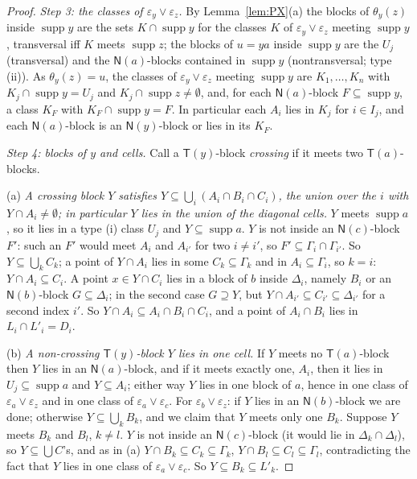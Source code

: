 \documentclass[11pt]{amsart}
\theoremstyle{definition}
\newcommand{\supp}{\operatorname{supp}}
\newcommand{\T}{\mathsf{T}}
\newcommand{\N}{\mathsf{N}}
\begin{document}
\begin{proof}
\smallskip\emph{Step 3: the classes of $\varepsilon_y\vee\varepsilon_z$.} By Lemma~\ref{lem:PX}(a) the blocks of $\theta_y(z)$ inside $\supp y$ are the sets $K\cap\supp y$ for the classes $K$ of $\varepsilon_y\vee\varepsilon_z$ meeting $\supp y$, transversal iff $K$ meets $\supp z$; the blocks of $u=ya$ inside $\supp y$ are the $U_j$ (transversal) and the $\N(a)$-blocks contained in $\supp y$ (nontransversal; type (ii)). As $\theta_y(z)=u$, the classes of $\varepsilon_y\vee\varepsilon_z$ meeting $\supp y$ are $K_1,\dots,K_n$ with $K_j\cap\supp y=U_j$ and $K_j\cap\supp z\ne\emptyset$, and, for each $\N(a)$-block $F\subseteq\supp y$, a class $K_F$ with $K_F\cap\supp y=F$. In particular each $A_i$ lies in $K_j$ for $i\in I_j$, and each $\N(a)$-block is an $\N(y)$-block or lies in its $K_F$.

\smallskip\emph{Step 4: blocks of $y$ and cells.} Call a $\T(y)$-block \emph{crossing} if it meets two $\T(a)$-blocks.

(a) \emph{A crossing block $Y$ satisfies $Y\subseteq\bigcup_i(A_i\cap B_i\cap C_i)$, the union over the $i$ with $Y\cap A_i\ne\emptyset$; in particular $Y$ lies in the union of the diagonal cells.} $Y$ meets $\supp a$, so it lies in a type (i) class $U_j$ and $Y\subseteq\supp a$. $Y$ is not inside an $\N(c)$-block $F'$: such an $F'$ would meet $A_i$ and $A_{i'}$ for two $i\ne i'$, so $F'\subseteq\Gamma_i\cap\Gamma_{i'}$. So $Y\subseteq\bigcup_kC_k$; a point of $Y\cap A_i$ lies in some $C_k\subseteq\Gamma_k$ and in $A_i\subseteq\Gamma_i$, so $k=i$: $Y\cap A_i\subseteq C_i$. A point $x\in Y\cap C_i$ lies in a block of $b$ inside $\Delta_i$, namely $B_i$ or an $\N(b)$-block $G\subseteq\Delta_i$; in the second case $G\supseteq Y$, but $Y\cap A_{i'}\subseteq C_{i'}\subseteq\Delta_{i'}$ for a second index $i'$. So $Y\cap A_i\subseteq A_i\cap B_i\cap C_i$, and a point of $A_i\cap B_i$ lies in $L_i\cap L'_i=D_i$.

(b) \emph{A non-crossing $\T(y)$-block $Y$ lies in one cell.} If $Y$ meets no $\T(a)$-block then $Y$ lies in an $\N(a)$-block, and if it meets exactly one, $A_i$, then it lies in $U_j\subseteq\supp a$ and $Y\subseteq A_i$; either way $Y$ lies in one block of $a$, hence in one class of $\varepsilon_a\vee\varepsilon_z$ and in one class of $\varepsilon_a\vee\varepsilon_c$. For $\varepsilon_b\vee\varepsilon_z$: if $Y$ lies in an $\N(b)$-block we are done; otherwise $Y\subseteq\bigcup_kB_k$, and we claim that $Y$ meets only one $B_k$. Suppose $Y$ meets $B_k$ and $B_l$, $k\ne l$. $Y$ is not inside an $\N(c)$-block (it would lie in $\Delta_k\cap\Delta_l$), so $Y\subseteq\bigcup C$'s, and as in (a) $Y\cap B_k\subseteq C_k\subseteq\Gamma_k$, $Y\cap B_l\subseteq C_l\subseteq\Gamma_l$, contradicting the fact that $Y$ lies in one class of $\varepsilon_a\vee\varepsilon_c$. So $Y\subseteq B_k\subseteq L'_k$.


\end{proof}
\end{document}
